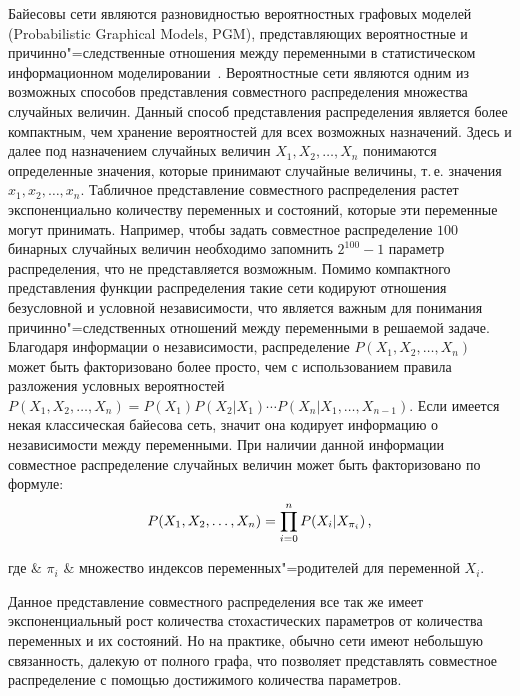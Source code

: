 Байесовы сети являются разновидностью вероятностных графовых моделей (Probabilistic Graphical Models, PGM), представляющих вероятностные и причинно"=следственные отношения между переменными в статистическом информационном моделировании~\cite{terehov_2003}.
Вероятностные сети являются одним из возможных способов представления совместного распределения множества случайных величин.
Данный способ представления распределения является более компактным, чем хранение вероятностей для всех возможных назначений.
Здесь и далее под назначением случайных величин $ X_1, X_2, \dotsc, X_n $ понимаются определенные значения, которые принимают случайные величины, т.\,е. значения $ x_1, x_2, \dotsc, x_n $.
Табличное представление совместного распределения растет экспоненциально количеству переменных и состояний, которые эти переменные могут принимать.
Например, чтобы задать совместное распределение $ 100 $ бинарных случайных величин необходимо запомнить $ 2^{100} - 1 $ параметр распределения, что не представляется возможным.
Помимо компактного представления функции распределения такие сети кодируют отношения безусловной и условной независимости, что является важным для понимания причинно"=следственных отношений между переменными в решаемой задаче.
Благодаря информации о независимости, распределение $ P(X_1, X_2,\dotsc, X_n) $ может быть факторизовано более просто, чем с использованием правила разложения условных вероятностей $ P(X_1, X_2,\dotsc, X_n) = P(X_1) P(X_2|X_1) \dotsm P(X_n|X_1,\dotsc,X_{n-1}) $.
Если имеется некая классическая байесова сеть, значит она кодирует информацию о независимости между переменными.
При наличии данной информации совместное распределение случайных величин может быть факторизовано по формуле:
\begin{equation}
    \label{eq:domain:bayes_net:joint_disitr}
    P(X_1, X_2,\dotsc, X_n) = \prod_{i = 0}^{n}{P(X_i|X_{\pi_i})} \text{\,,}
\end{equation}
\begin{explanation}
    где & $ \pi_i $ & множество индексов переменных"=родителей для переменной $X_i$.
\end{explanation}

Данное представление совместного распределения все так же имеет экспоненциальный рост количества стохастических параметров от количества переменных и их состояний.
Но на практике, обычно сети имеют небольшую связанность, далекую от полного графа, что позволяет представлять совместное распределение с помощью достижимого количества параметров.


